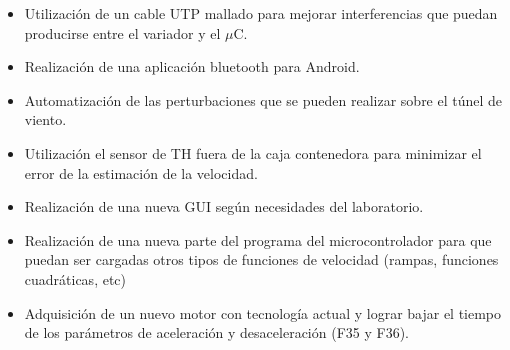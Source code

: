 \begin{itemize}
	\item Utilización de un cable UTP mallado para mejorar interferencias que puedan producirse entre el variador y el $\mu$C.
\item Realización de una aplicación bluetooth para Android.
\item Automatización de las perturbaciones que se pueden realizar sobre el túnel de viento.
\item Utilización el sensor de TH fuera de la caja contenedora para minimizar  el error de la estimación de la velocidad.
\item Realización de una nueva GUI según necesidades del laboratorio.
\item Realización de una nueva parte del programa del microcontrolador para que puedan ser cargadas otros tipos de funciones de velocidad (rampas, funciones cuadráticas, etc)
\item Adquisición de un nuevo motor con tecnología actual y lograr bajar el tiempo de los parámetros de aceleración y desaceleración (F35 y F36).
\end{itemize}